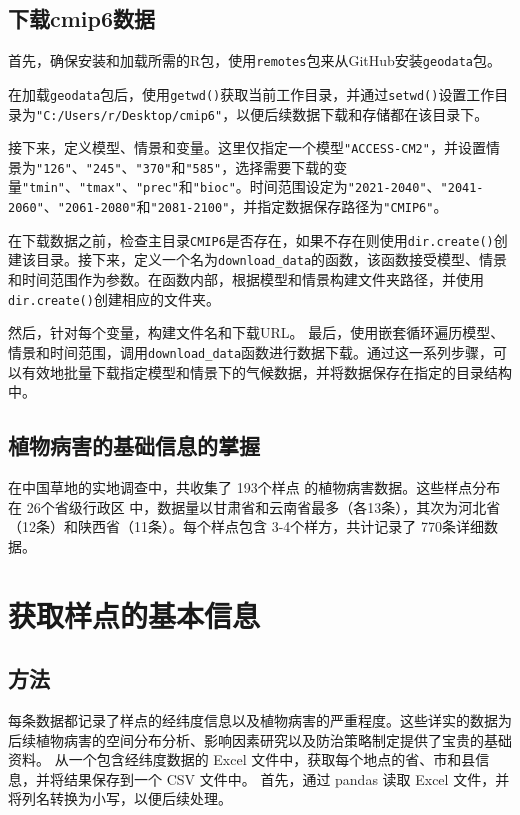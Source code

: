 \documentclass[AutoFakeBold]{LZUThesis-PgD&PhD}
\begin{document}
	
	\subsection{下载cmip6数据}

	首先，确保安装和加载所需的R包，使用\texttt{remotes}包\cite{remotes}来从GitHub安装\texttt{geodata}包\cite{geodata}。
	
	在加载\texttt{geodata}包后，使用\texttt{getwd()}获取当前工作目录，并通过\texttt{setwd()}设置工作目录为\texttt{"C:/Users/r/Desktop/cmip6"}，以便后续数据下载和存储都在该目录下。
	
	接下来，定义模型、情景和变量。这里仅指定一个模型\texttt{"ACCESS-CM2"}，并设置情景为\texttt{"126"}、\texttt{"245"}、\texttt{"370"}和\texttt{"585"}，选择需要下载的变量\texttt{"tmin"}、\texttt{"tmax"}、\texttt{"prec"}和\texttt{"bioc"}。时间范围设定为\texttt{"2021-2040"}、\texttt{"2041-2060"}、\texttt{"2061-2080"}和\texttt{"2081-2100"}，并指定数据保存路径为\texttt{"CMIP6"}。
	
	在下载数据之前，检查主目录\texttt{CMIP6}是否存在，如果不存在则使用\texttt{dir.create()}创建该目录。接下来，定义一个名为\texttt{download\_data}的函数，该函数接受模型、情景和时间范围作为参数。在函数内部，根据模型和情景构建文件夹路径，并使用\texttt{dir.create()}创建相应的文件夹。
	
	然后，针对每个变量，构建文件名和下载URL。
	最后，使用嵌套循环遍历模型、情景和时间范围，调用\texttt{download\_data}函数进行数据下载。通过这一系列步骤，可以有效地批量下载指定模型和情景下的气候数据，并将数据保存在指定的目录结构中。
	
	
	\subsection{植物病害的基础信息的掌握}

	在中国草地的实地调查中，共收集了 193个样点 的植物病害数据。这些样点分布在 26个省级行政区 中，数据量以甘肃省和云南省最多（各13条），其次为河北省（12条）和陕西省（11条）。每个样点包含 3-4个样方，共计记录了 770条详细数据。
	
	
	\section{获取样点的基本信息}
	
	\subsection{方法}

	每条数据都记录了样点的经纬度信息以及植物病害的严重程度。这些详实的数据为后续植物病害的空间分布分析、影响因素研究以及防治策略制定提供了宝贵的基础资料。
	从一个包含经纬度数据的 Excel 文件中，获取每个地点的省、市和县信息，并将结果保存到一个 CSV 文件中。
	首先，通过 pandas 读取 Excel 文件，并将列名转换为小写，以便后续处理。
	
\end{document}
